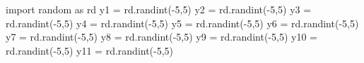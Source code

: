 \documentclass{article}
\begin{document}
\begin{pycode}
import random as rd
y1 = rd.randint(-5,5)
y2 = rd.randint(-5,5)
y3 = rd.randint(-5,5)
y4 = rd.randint(-5,5)
y5 = rd.randint(-5,5)
y6 = rd.randint(-5,5)
y7 = rd.randint(-5,5)
y8 = rd.randint(-5,5)
y9 = rd.randint(-5,5)
y10 = rd.randint(-5,5)
y11 = rd.randint(-5,5)
\end{pycode}

\begin{pysub}
\end{pysub}
\end{document}
